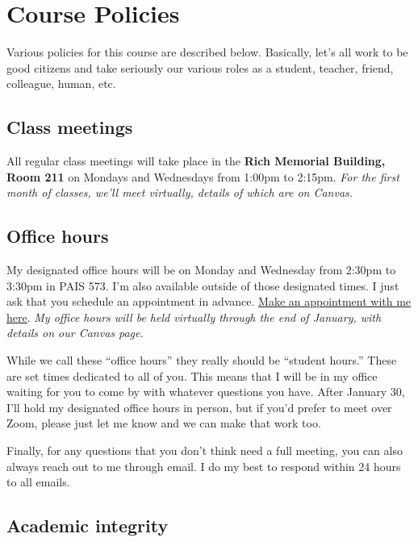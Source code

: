 \documentclass[11pt,]{article}
\begin{document}
\hypertarget{course-policies}{%
\section{Course Policies}\label{course-policies}}

Various policies for this course are described below. Basically, let's
all work to be good citizens and take seriously our various roles as a
student, teacher, friend, colleague, human, etc.

\hypertarget{class-meetings}{%
\subsection{Class meetings}\label{class-meetings}}

All regular class meetings will take place in the \textbf{Rich Memorial
Building, Room 211} on Mondays and Wednesdays from 1:00pm to 2:15pm.
\emph{For the first month of classes, we'll meet virtually, details of
which are on Canvas.}

\hypertarget{office-hours}{%
\subsection{Office hours}\label{office-hours}}

My designated office hours will be on Monday and Wednesday from 2:30pm
to 3:30pm in PAIS 573. I'm also available outside of those designated
times. I just ask that you schedule an appointment in advance.
\href{https://mccarthy-meetings.youcanbook.me/}{Make an appointment with
me here}. \emph{My office hours will be held virtually through the end
of January, with details on our Canvas page.}

While we call these ``office hours'' they really should be ``student
hours.'' These are set times dedicated to all of you. This means that I
will be in my office waiting for you to come by with whatever questions
you have. After January 30, I'll hold my designated office hours in
person, but if you'd prefer to meet over Zoom, please just let me know
and we can make that work too.

Finally, for any questions that you don't think need a full meeting, you
can also always reach out to me through email. I do my best to respond
within 24 hours to all emails.

\hypertarget{academic-integrity}{%
\subsection{Academic integrity}\label{academic-integrity}}
\end{document}
